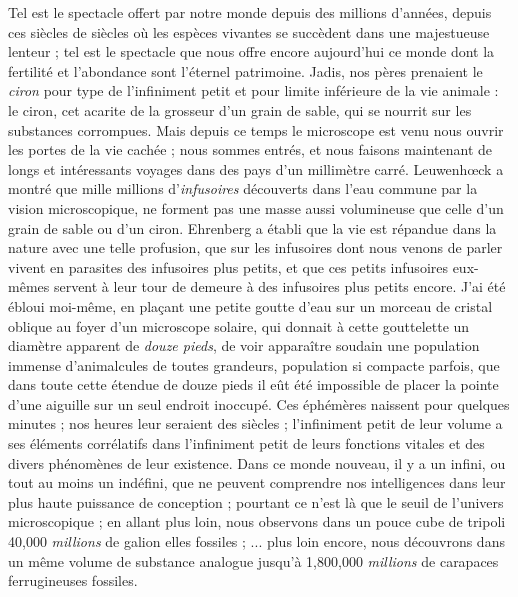 \documentclass[a4paper, 11pt, oneside]{article}
\begin{document}
Tel est le spectacle offert par notre monde depuis des millions d'années, depuis ces siècles de siècles où les espèces vivantes se succèdent dans une majestueuse lenteur ; tel est le spectacle que nous offre encore aujourd'hui ce monde dont la fertilité et l'abondance sont l'éternel patrimoine. Jadis, nos pères prenaient le \emph{ciron} pour type de l'infiniment petit et pour limite inférieure de la vie animale : le ciron, cet acarite de la grosseur d'un grain de sable, qui se nourrit sur les substances corrompues. Mais depuis ce temps le microscope est venu nous ouvrir les portes de la vie cachée ; nous sommes entrés, et nous faisons maintenant de longs et intéressants voyages dans des pays d'un millimètre carré. Leuwenhœck a montré que mille millions d'\emph{infusoires} découverts dans l'eau commune par la vision microscopique, ne forment pas une masse aussi volumineuse que celle d'un grain de sable ou d'un ciron. Ehrenberg a établi que la vie est répandue dans la nature avec une telle profusion, que sur les infusoires dont nous venons de parler vivent en parasites des infusoires plus petits, et que ces petits infusoires eux-mêmes servent à leur tour de demeure à des infusoires plus petits encore. J'ai été ébloui moi-même, en plaçant une petite goutte d'eau sur un morceau de cristal oblique au foyer d'un microscope solaire, qui donnait à cette gouttelette un diamètre apparent de \emph{douze pieds}, de voir apparaître soudain une population immense d'animalcules de toutes grandeurs, population si compacte parfois, que dans toute cette étendue de douze pieds il eût été impossible de placer la pointe d'une aiguille sur un seul endroit inoccupé. Ces éphémères naissent pour quelques minutes ; nos heures leur seraient des siècles ; l'infiniment petit de leur volume a ses éléments corrélatifs dans l'infiniment petit de leurs fonctions vitales et des divers phénomènes de leur existence. Dans ce monde nouveau, il y a un infini, ou tout au moins un indéfini, que ne peuvent comprendre nos intelligences dans leur plus haute puissance de conception ; pourtant ce n'est là que le seuil de l'univers microscopique ; en allant plus loin, nous observons dans un pouce cube de tripoli 40,000 \emph{millions} de galion elles fossiles ; ... plus loin encore, nous découvrons dans un même volume de substance analogue jusqu'à 1,800,000 \emph{millions} de carapaces ferrugineuses fossiles.
\end{document}
